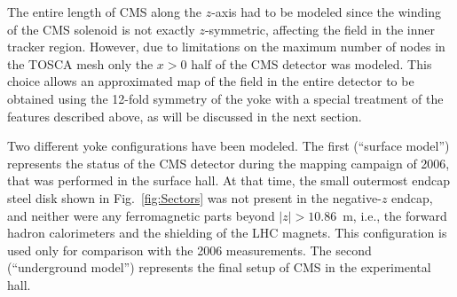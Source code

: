 The entire length of CMS along the $z$-axis had to be modeled since the
winding of the CMS solenoid is not exactly $z$-symmetric, affecting the field
in the inner tracker region. However, due to limitations on the
maximum number of nodes in the TOSCA mesh only the $x>0$ half of the
CMS detector was modeled. This choice allows an approximated map
of the field in the entire detector to be obtained using the 12-fold symmetry of the yoke
with a special treatment of the features described above, as will be
discussed in the next section.

Two different yoke configurations have been modeled. The first
(``surface model'') represents the
status of the CMS detector during the mapping campaign of 2006, that
was performed in the surface hall. At that time, the small outermost
endcap steel disk shown in Fig.~\ref{fig:Sectors}
was not present in the negative-$z$ endcap,
and neither were any ferromagnetic parts beyond
$|z|>10.86$~m, i.e., the forward hadron calorimeters and
the shielding of the LHC magnets. This configuration is used only for
comparison with the 2006 measurements.
The second (``underground model'') represents the final setup of
CMS in the experimental hall.


